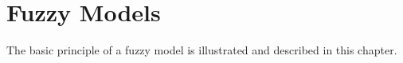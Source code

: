 %


\newpage
\section{Fuzzy Models}
The basic principle of a fuzzy model is illustrated and described in this chapter.

